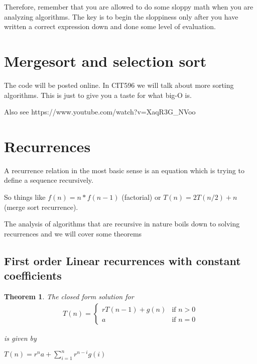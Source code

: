 \documentclass[12pt]{article}
\newtheorem{theorem}{Theorem}
\begin{document}
Therefore, remember that you are allowed to do some sloppy math when you are analyzing algorithms. The key is to begin the sloppiness only after you have written a correct expression down and done some level of evaluation.


\section*{Mergesort and selection sort}

The code will be posted online. In CIT596 we will talk about more sorting algorithms. This is just to give you a taste for what big-O is.

Also see https://www.youtube.com/watch?v=XaqR3G\_NVoo

\section*{Recurrences}

A recurrence relation in the most basic sense is an equation which is trying to define a sequence recursively.

So things like $f(n) = n * f(n-1)$ (factorial) or $T(n) = 2T(n/2) + n$ (merge sort recurrence). 

The analysis of algorithms that are recursive in nature boils down to solving recurrences and we will cover some theorems

\subsection*{First order Linear recurrences with constant coefficients}

\begin{theorem}
The closed form solution for
\begin{align*}
T(n) = \begin{cases}
rT(n-1) + g(n) & \mbox{if } n > 0\\
a & \mbox{if } n = 0
\end{cases}
\end{align*}

is given by

$T(n) = r^n a + \sum_{i=1}^n r^{n-i} g(i)$

\end{theorem}
\end{document}
